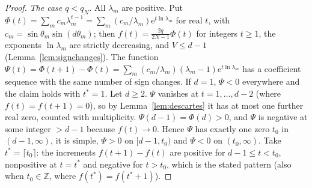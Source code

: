 \documentclass[11pt,a4paper]{article}
\theoremstyle{definition}
\theoremstyle{remark}
\newcommand{\Z}{\mathbb{Z}}
\newcommand{\ee}{\mathrm{e}}
\begin{document}
\begin{proof}
\emph{The case $q<q_N$.} All $\lambda_m$ are positive. Put $\Phi(t)=\sum_mc_m\lambda_m^{t-1}=\sum_m(c_m/\lambda_m)\ee^{t\ln\lambda_m}$ for
real $t$, with $c_m=\sin\theta_m\sin(d\theta_m)$; then $f(t)=\frac{2q}{2N-1}\Phi(t)$ for integers $t\ge1$, the
exponents $\ln\lambda_m$ are strictly decreasing, and $V\le d-1$ (Lemma~\ref{lem:signchanges}). The function
$\Psi(t)=\Phi(t+1)-\Phi(t)=\sum_m(c_m/\lambda_m)(\lambda_m-1)\ee^{t\ln\lambda_m}$ has a coefficient sequence
with the same number of sign changes. If $d=1$, $\Psi<0$ everywhere and the claim holds with $t^*=1$. Let
$d\ge2$. $\Psi$ vanishes at $t=1,\dots,d-2$ (where $f(t)=f(t+1)=0$), so by Lemma~\ref{lem:descartes} it has at
most one further real zero, counted with multiplicity. $\Psi(d-1)=\Phi(d)>0$, and $\Psi$ is negative at some
integer $>d-1$ because $f(t)\to0$. Hence $\Psi$ has exactly one zero $t_0$ in $(d-1,\infty)$, it is simple,
$\Psi>0$ on $[d-1,t_0)$ and $\Psi<0$ on $(t_0,\infty)$. Take $t^*=\lceil t_0\rceil$: the increments $f(t+1)-f(t)$ are
positive for $d-1\le t<t_0$, nonpositive at $t=t^*$ and negative for $t>t_0$, which is the stated pattern (also when
$t_0\in\Z$, where $f(t^*)=f(t^*+1)$).


\end{proof}
\end{document}
